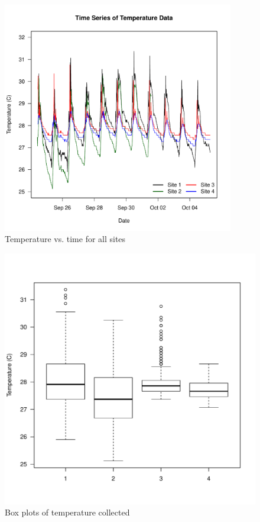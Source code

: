 \documentclass{article}\usepackage[]{graphicx}\usepackage[]{color}
\makeatletter
\def\maxwidth{ %
  \ifdim\Gin@nat@width>\linewidth
    \linewidth
  \else
    \Gin@nat@width
  \fi
}
\newenvironment{knitrout}{}{} %
\makeatother
\begin{document}
\begin{figure}[!ht]
\includegraphics[width=0.90\textwidth]{Figures/Temp}
\caption{Temperature vs. time for all sites}
\label{fig:Temp}
\end{figure}
\begin{figure}
\begin{knitrout}
\color{fgcolor}
\includegraphics[width=\maxwidth]{figure/unnamed-chunk-5-1} 

\end{knitrout}
\label{fig:tempbox}
\caption{Box plots of temperature collected}
\end{figure}
\end{document}
